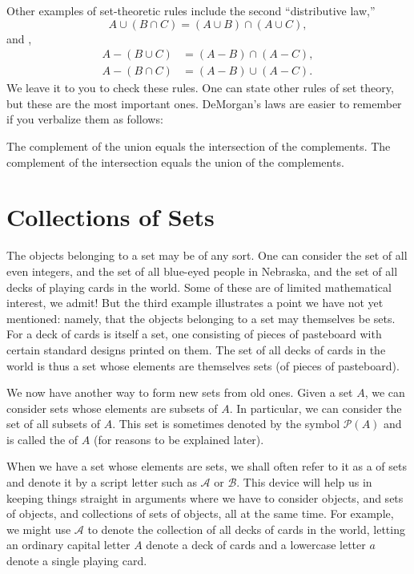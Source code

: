 Other examples of set-theoretic rules include the second ``distributive law,''
\[
A \cup ({B \cap C}) = ({A \cup B}) \cap ({A \cup C}),
\]
and ,
\[
\begin{aligned}
A - ({B \cup C}) &= ({A - B}) \cap ({A - C}),\\
A - ({B \cap C}) &= ({A - B}) \cup ({A - C}).
\end{aligned}
\]
We leave it to you to check these rules. One can state other rules of set theory,
but these are the most important ones. DeMorgan's laws are easier to remember 
if you verbalize them as follows:

\begin{centeredblock}
 The complement of the union equals the intersection of the complements.
 The complement of the intersection equals the union of the complements.
\end{centeredblock}

\section*{Collections of Sets}

The objects belonging to a set may be of any sort. One can consider the set of all even 
integers, and the set of all blue-eyed people in Nebraska, and the set of all decks of 
playing cards in the world. Some of these are of limited mathematical interest, we admit! 
But the third example illustrates a point we have not yet mentioned: namely, that the objects 
belonging to a set may themselves be sets. For a deck of cards is itself a set, one consisting 
of pieces of pasteboard with certain standard designs printed on them. The set of all decks of 
cards in the world is thus a set whose elements are themselves sets (of pieces of pasteboard).

We now have another way to form new sets from old ones. Given a set \(A\), we can consider 
sets whose elements are subsets of \(A\). In particular, we can consider the set of all subsets 
of \(A\). This set is sometimes denoted by the symbol \(\mathcal{P}(A)\) and is called the  of \(A\) 
(for reasons to be explained later).

When we have a set whose elements are sets, we shall often refer to it as a  of sets 
and denote it by a script letter such as \(\mathcal{A}\) or \(\mathcal{B}\). This device will 
help us in keeping things straight in arguments where we have to consider objects, and sets of 
objects, and collections of sets of objects, all at the same time. For example, we might use 
\(\mathcal{A}\) to denote the collection of all decks of cards in the world, letting an ordinary 
capital letter \(A\) denote a deck of cards and a lowercase letter \(a\) denote a single playing card.

